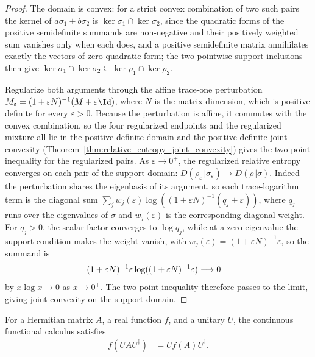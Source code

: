 \begin{proof}\leanok
    The domain is convex: for a strict convex combination of two such pairs the
    kernel of $a\sigma_1+b\sigma_2$ is $\ker\sigma_1\cap\ker\sigma_2$, since the
    quadratic forms of the positive semidefinite summands are non-negative and
    their positively weighted sum vanishes only when each does, and a positive
    semidefinite matrix annihilates exactly the vectors of zero quadratic form;
    the two pointwise support inclusions then give
    $\ker\sigma_1\cap\ker\sigma_2\subseteq\ker\rho_1\cap\ker\rho_2$.

    Regularize both arguments through the affine trace-one perturbation
    $M_\varepsilon=(1+\varepsilon N)^{-1}(M+\varepsilon\Id)$, where $N$
    is the matrix dimension, which is positive definite for every
    $\varepsilon>0$. Because the perturbation is affine, it commutes with the
    convex combination, so the four regularized endpoints and the regularized
    mixture all lie in the positive definite domain and the positive definite
    joint convexity (Theorem~\ref{thm:relative_entropy_joint_convexity}) gives
    the two-point inequality for the regularized pairs. As
    $\varepsilon\to0^+$, the regularized relative entropy converges on each pair
    of the support domain:
    $D(\rho_\varepsilon\Vert\sigma_\varepsilon)
        \to D(\rho\Vert\sigma)$.
    Indeed the perturbation shares the eigenbasis of its argument, so each
    trace-logarithm term is the diagonal sum
    $\sum_jw_j(\varepsilon)
        \log((1+\varepsilon N)^{-1}(q_j+\varepsilon))$,
    where $q_j$ runs over the eigenvalues of $\sigma$ and
    $w_j(\varepsilon)$ is the corresponding diagonal weight. For $q_j>0$, the
    scalar factor converges to $\log q_j$, while at a zero eigenvalue the support
    condition makes the weight vanish, with
    $w_j(\varepsilon)=(1+\varepsilon N)^{-1}\varepsilon$, so the summand is
    \begin{align}
         & (1+\varepsilon N)^{-1}\varepsilon
        \log((1+\varepsilon N)^{-1}\varepsilon)\longrightarrow0
        \notag
    \end{align}
    by $x\log x\to0$ as $x\to0^+$. The two-point inequality therefore passes to
    the limit, giving joint convexity on the support domain.
\end{proof}

\begin{lemma}
    \label{lem:cfc_conj_unitary}
    \leanok
    For a Hermitian matrix $A$, a real function $f$, and a unitary $U$, the
    continuous functional calculus satisfies
    \begin{align}
        f(UAU^\dagger)
         & =Uf(A)U^\dagger.
        \label{eq:entropy_cfc_conjugation}
    \end{align}
\end{lemma}


